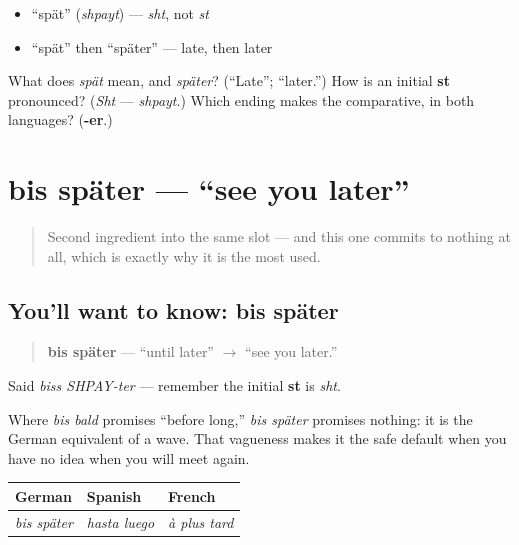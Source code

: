 \begin{itemize}
\raggedright
  \item \textquotedblleft{}spät\textquotedblright{} (\emph{shpayt}) — \emph{sht}, not \emph{st}
  \item \textquotedblleft{}spät\textquotedblright{} then \textquotedblleft{}später\textquotedblright{} — late, then later
\end{itemize}

\begin{tcolorbox}[breakable,colback=teal!4,colframe=teal!35!black,title={Before you move on}]
What does \emph{spät} mean, and \emph{später}? (\textquotedblleft{}Late\textquotedblright{}; \textquotedblleft{}later.\textquotedblright{}) How is an initial \textbf{st} pronounced? (\emph{Sht} — \emph{shpayt}.) Which ending makes the comparative, in both languages? (\textbf{-er}.)
\end{tcolorbox}
\section[bis später]{bis später — \textquotedblleft{}see you later\textquotedblright{}}

\label{lesson:GE-C04-bis-spater}



\begin{quote}
Second ingredient into the same slot — and this one commits to nothing at all, which is exactly why it is the most used.
\end{quote}

\subsection*{You'll want to know: bis später}
\begin{quote}
\textbf{bis später} — \textquotedblleft{}until later\textquotedblright{} $\to$ \textquotedblleft{}see you later.\textquotedblright{}
\end{quote}

Said \emph{biss SHPAY-ter} — remember the initial \textbf{st} is \emph{sht}.

Where \emph{bis bald} promises \textquotedblleft{}before long,\textquotedblright{} \emph{bis später} promises nothing: it is the German equivalent of a wave. That vagueness makes it the safe default when you have no idea when you will meet again.

\noindent
\begin{tabularx}{\linewidth}{@{}>{\raggedright\arraybackslash}X>{\raggedright\arraybackslash}X>{\raggedright\arraybackslash}X@{}}
\toprule
\textbf{German} & \textbf{Spanish} & \textbf{French} \\
\midrule
\emph{bis später} & \emph{hasta luego} & \emph{à plus tard} \\
\bottomrule
\end{tabularx}

